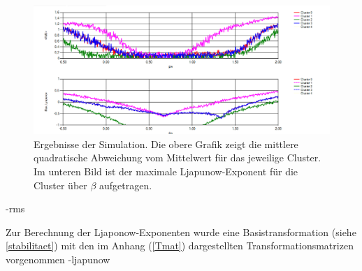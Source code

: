 \begin{figure}
	\centering
	\includegraphics[width=1.0\textwidth]{abb/misc/ljapResult.png}
	\caption{Ergebnisse der Simulation. Die obere Grafik zeigt die mittlere quadratische Abweichung vom Mittelwert für das jeweilige Cluster. Im unteren Bild ist der maximale Ljapunow-Exponent für die Cluster über $\beta$ aufgetragen.}
	\label{fig:ljapResult}
\end{figure}
-rms

Zur Berechnung der Ljaponow-Exponenten wurde eine Basistransformation (siehe \ref{stabilitaet}) mit den im Anhang (\ref{Tmat}) dargestellten Transformationsmatrizen vorgenommen \cite{pecora2014,sagenotebook}
-ljapunow


